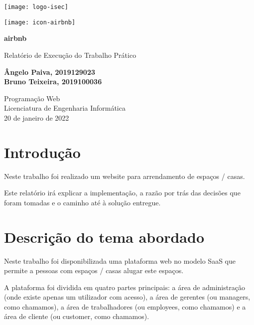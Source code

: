 \documentclass[11pt]{article}
\begin{document}
	\begin{titlepage}
		\begin{center}
			\texttt{[image: logo-isec]}
			
			\vspace*{\fill}
			
			\texttt{[image: icon-airbnb]}
			
			\Huge
			\textbf{airbnb}
			
			\huge
			Relatório de Execução do Trabalho Prático
			
			\vspace{2cm}
			
			\Large
			\textbf{
				Ângelo Paiva, 2019129023 \\
				Bruno Teixeira, 2019100036
			}
			
			\vfill
			\vspace*{\fill}
			
			\normalsize
			Programação Web \\
			Licenciatura de Engenharia Informática \\
			20 de janeiro de 2022		
		\end{center}
	\end{titlepage}
	
	\tableofcontents
	\pagebreak
	
	\large
	\section{Introdução}
	\normalsize
	
	Neste trabalho foi realizado um website para arrendamento de espaços / casas.
	
	Este relatório irá explicar a implementação, a razão por trás das decisões que foram tomadas e o caminho até à solução entregue.
	

    \large
    \section{Descrição do tema abordado}
    \normalsize
    
    Neste trabalho foi disponibilizada uma plataforma web no modelo SaaS que permite a pessoas com espaços / casas alugar este espaços.
    
    A plataforma foi dividida em quatro partes principais: a área de administração (onde existe apenas um utilizador com acesso), a área de gerentes (ou managers, como chamamos), a área de trabalhadores (ou employees, como chamamos) e a área de cliente (ou customer, como chamamos).
    
\end{document}

